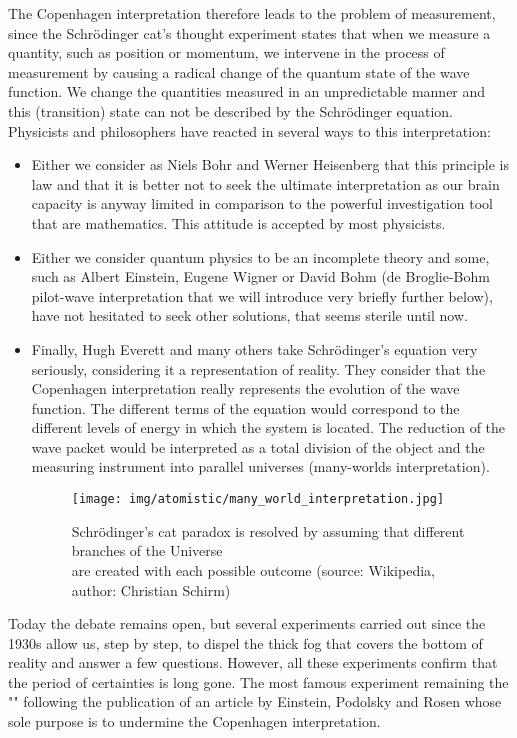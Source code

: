 	The Copenhagen interpretation therefore leads to the problem of measurement, since the Schrödinger cat's thought experiment states that when we measure a quantity, such as position or momentum, we intervene in the process of measurement by causing a radical change of the quantum state of the wave function. We change the quantities measured in an unpredictable manner and this (transition) state can not be described by the Schrödinger equation. Physicists and philosophers have reacted in several ways to this interpretation:
	\begin{itemize}
		\item Either we consider as Niels Bohr and Werner Heisenberg that this principle is law and that it is better not to seek the ultimate interpretation as our brain capacity is anyway limited in comparison to the powerful investigation tool that are mathematics. This attitude is accepted by most physicists.
		
		\item Either we consider quantum physics to be an incomplete theory and some, such as Albert Einstein, Eugene Wigner or David Bohm (de Broglie-Bohm pilot-wave interpretation that we will introduce very briefly further below), have not hesitated to seek other solutions, that seems sterile until now.
		
		\item Finally, Hugh Everett and many others take Schrödinger's equation very seriously, considering it a representation of reality. They consider that the  Copenhagen interpretation really represents the evolution of the wave function. The different terms of the equation would correspond to the different levels of energy in which the system is located. The reduction of the wave packet would be interpreted as a total division of the object and the measuring instrument into parallel universes (many-worlds interpretation).
		\begin{figure}[H]
			\centering
			\texttt{[image: img/atomistic/many\_world\_interpretation.jpg]}
			\caption[]{Schrödinger's cat paradox is resolved by assuming that different branches of the Universe\\ are created with each possible outcome (source: Wikipedia, author: Christian Schirm)}
		\end{figure}
	\end{itemize}
	
	Today the debate remains open, but several experiments carried out since the 1930s allow us, step by step, to dispel the thick fog that covers the bottom of reality and answer a few questions. However, all these experiments confirm that the period of certainties is long gone. The most famous experiment remaining the "" following the publication of an article by Einstein, Podolsky and Rosen whose sole purpose is to undermine the Copenhagen interpretation.
	

